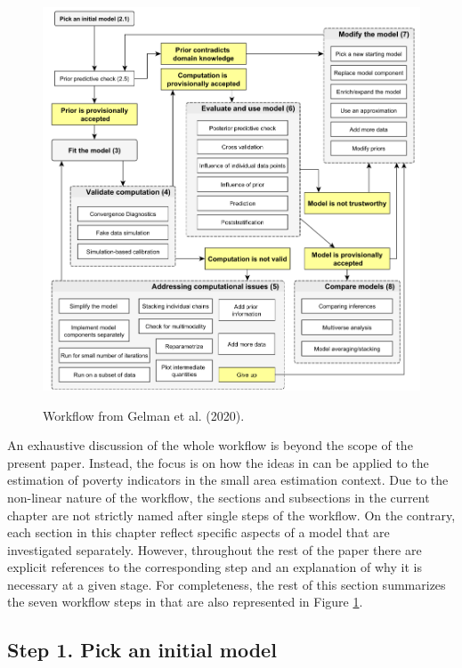 \begin{figure}
    \includegraphics[width=16cm]{./graphics/workflow}
    \label{fig:gelman_wf}
    \caption{Workflow from Gelman et al. (2020).}
\end{figure}


An exhaustive discussion of the whole workflow is beyond the scope of the present paper.
Instead, the focus is on how the ideas in \cite{gelman_bayesian_2020} can be applied to the estimation of poverty indicators in the small area estimation context.
Due to the non-linear nature of the workflow, the sections and subsections in the current chapter are not strictly named after single steps of the workflow.
On the contrary, each section in this chapter reflect specific aspects of a model that are investigated separately.
However, throughout the rest of the paper there are explicit references to the corresponding step and an explanation of why it is necessary at a given stage.
For completeness, the rest of this section summarizes the seven workflow steps in \cite{gelman_bayesian_2020} that are also represented in Figure \ref{fig:gelman_wf}.

\subsection{Step 1. Pick an initial model}

